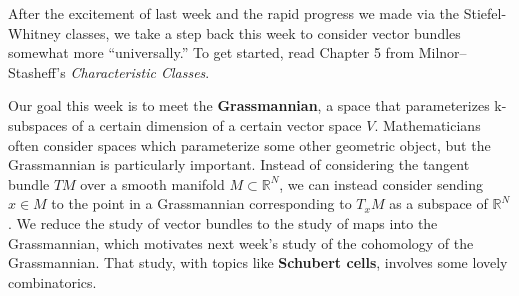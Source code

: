 \documentclass{homework}
\author{Jim Fowler}
\date{Week 4: Grassmannians}
\begin{document}
\maketitle

After the excitement of last week and the rapid progress we made via
the Stiefel-Whitney classes, we take a step back this week to consider
vector bundles somewhat more ``universally.''  To get started, read
Chapter 5 from Milnor--Stasheff's \textit{Characteristic Classes}.

Our goal this week is to meet the \textbf{Grassmannian}, a space that
parameterizes k- subspaces of a certain dimension of a certain vector
space $V$.  Mathematicians often consider spaces which parameterize
some other geometric object, but the Grassmannian is particularly
important.  Instead of considering the tangent bundle $TM$ over a
smooth manifold $M \subset \mathbb{R}^N$, we can instead consider
sending $x \in M$ to the point in a Grassmannian corresponding to
$T_x M$ as a subspace of $\mathbb{R}^N$.  We reduce the study of
vector bundles to the study of maps into the Grassmannian, which
motivates next week's study of the cohomology of the Grassmannian.
That study, with topics like \textbf{Schubert cells}, involves some
lovely combinatorics.
\end{document}
